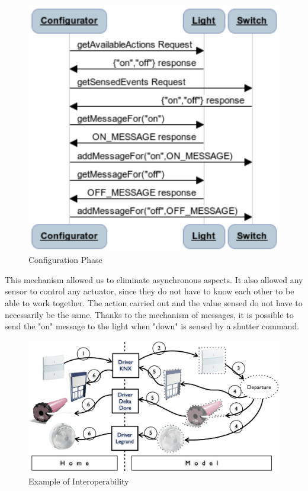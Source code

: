 \begin{figure}
\centering
\includegraphics[width=.5\textwidth]{part2/pics/SequenceDiagram.pdf}
\caption{Configuration Phase}
\label{fig:seqDiagConfMom}
\end{figure}

This mechanism allowed us to eliminate asynchronous aspects. It also allowed any sensor to control any actuator, since they do not have to know each other to be able to work together. The action carried out and the value sensed do not have to necessarily be the same. Thanks to the mechanism of messages, it is possible to send the "on" message to the light when "down" is sensed by a shutter command.\\

\begin{figure}
\centering
\includegraphics[width=.8\textwidth]{part2/pics/InteropExample}
\caption{Example of Interoperability}
\label{fig:interopExample}
\end{figure}


